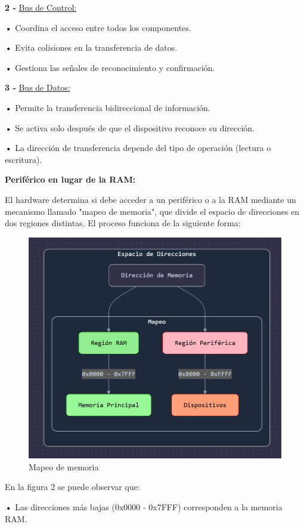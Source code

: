 \documentclass{article}
\begin{document}
\quad

\textbf{2 -  } {\underline{Bus de Control: }}

\quad

\textbf{    •} { Coordina el acceso entre todos los componentes.}

\textbf{    •} { Evita colisiones en la transferencia de datos.}

\textbf{    •} { Gestiona las señales de reconocimiento y confirmación.}

\quad

\textbf{3 -  } {\underline{Bus de Datos: }}

\quad

\textbf{    •} { Permite la transferencia bidireccional de información.}

\textbf{    •} { Se activa solo después de que el dispositivo reconoce su dirección.}

\textbf{    •} { La dirección de transferencia depende del tipo de operación (lectura o escritura).}



\quad

\textbf{Periférico en lugar de la RAM: }

\quad

{El hardware determina si debe acceder a un periférico o a la RAM mediante un mecanismo llamado "mapeo de memoria", que divide el espacio de direcciones en dos regiones distintas. El proceso funciona de la siguiente forma:}

\quad

\begin{figure}[h]
    \centering
    \includegraphics[width=5cm\textwidth]{figura_02.png}
    \caption{Mapeo de memoria}
    \label{fig:img2}
\end{figure}

\quad

{En la figura 2 se puede observar que:}

\quad

\textbf{    •} { Las direcciones más bajas (0x0000 - 0x7FFF) corresponden a la memoria RAM.}
\end{document}

